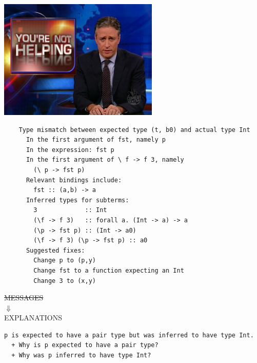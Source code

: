 \documentclass[xcolor=svgnames,12pt,aspectratio=169]{beamer}
\newenvironment{xframe}[1][]
  {\begin{frame}[fragile,environment=xframe,#1]}
  {\end{frame}}
\begin{document}

\begin{xframe}{}
  \begin{center}
    \includegraphics[width=3in]{not-helping.jpg}
  \end{center}
\end{xframe}

\begin{xframe}
  \footnotesize
  \begin{Verbatim}
    Type mismatch between expected type (t, b0) and actual type Int
      In the first argument of fst, namely p
      In the expression: fst p
      In the first argument of \ f -> f 3, namely
        (\ p -> fst p)
      Relevant bindings include:
        fst :: (a,b) -> a
      Inferred types for subterms:
        3             :: Int
        (\f -> f 3)   :: forall a. (Int -> a) -> a
        (\p -> fst p) :: (Int -> a0)
        (\f -> f 3) (\p -> fst p) :: a0
      Suggested fixes:
        Change p to (p,y)
        Change fst to a function expecting an Int
        Change 3 to (x,y)
  \end{Verbatim}
\end{xframe}

\begin{xframe}{}
  \Large
  \begin{center}
    \sout{MESSAGES} \\
    $\Downarrow$ \\
    EXPLANATIONS
  \end{center}
\end{xframe}

\begin{xframe}{}
  \small
\begin{Verbatim}
p is expected to have a pair type but was inferred to have type Int.
  + Why is p expected to have a pair type?
  + Why was p inferred to have type Int?







\end{Verbatim}
\end{xframe}
\end{document}

